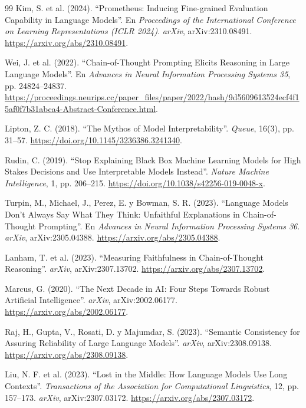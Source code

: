 \begin{thebibliography}{99}
Kim, S. et al. (2024).
``Prometheus: Inducing Fine-grained Evaluation Capability in Language Models''.
En \textit{Proceedings of the International Conference on Learning Representations (ICLR 2024)}.
\textit{arXiv}, arXiv:2310.08491.
\url{https://arxiv.org/abs/2310.08491}.

Wei, J. et al. (2022).
``Chain-of-Thought Prompting Elicits Reasoning in Large Language Models''.
En \textit{Advances in Neural Information Processing Systems 35}, pp. 24824--24837.
\url{https://proceedings.neurips.cc/paper_files/paper/2022/hash/9d5609613524ecf4f15af0f7b31abca4-Abstract-Conference.html}.

Lipton, Z. C. (2018).
``The Mythos of Model Interpretability''.
\textit{Queue}, 16(3), pp. 31--57.
\url{https://doi.org/10.1145/3236386.3241340}.

Rudin, C. (2019).
``Stop Explaining Black Box Machine Learning Models for High Stakes Decisions and Use Interpretable Models Instead''.
\textit{Nature Machine Intelligence}, 1, pp. 206--215.
\url{https://doi.org/10.1038/s42256-019-0048-x}.

Turpin, M., Michael, J., Perez, E. y Bowman, S. R. (2023).
``Language Models Don't Always Say What They Think: Unfaithful Explanations in Chain-of-Thought Prompting''.
En \textit{Advances in Neural Information Processing Systems 36}.
\textit{arXiv}, arXiv:2305.04388.
\url{https://arxiv.org/abs/2305.04388}.

Lanham, T. et al. (2023).
``Measuring Faithfulness in Chain-of-Thought Reasoning''.
\textit{arXiv}, arXiv:2307.13702.
\url{https://arxiv.org/abs/2307.13702}.

Marcus, G. (2020).
``The Next Decade in AI: Four Steps Towards Robust Artificial Intelligence''.
\textit{arXiv}, arXiv:2002.06177.
\url{https://arxiv.org/abs/2002.06177}.

Raj, H., Gupta, V., Rosati, D. y Majumdar, S. (2023).
``Semantic Consistency for Assuring Reliability of Large Language Models''.
\textit{arXiv}, arXiv:2308.09138.
\url{https://arxiv.org/abs/2308.09138}.

Liu, N. F. et al. (2023).
``Lost in the Middle: How Language Models Use Long Contexts''.
\textit{Transactions of the Association for Computational Linguistics}, 12, pp. 157--173.
\textit{arXiv}, arXiv:2307.03172.
\url{https://arxiv.org/abs/2307.03172}.


\end{thebibliography}
